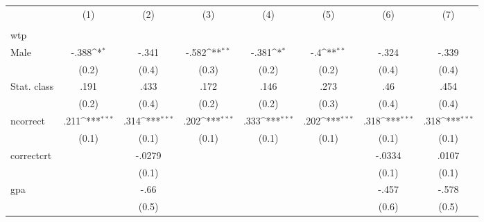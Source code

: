 {
\def\sym#1{\ifmmode^{#1}\else\(^{#1}\)\fi}
\begin{tabular}{l*{7}{c}}
\hline\hline
                &\multicolumn{1}{c}{(1)}&\multicolumn{1}{c}{(2)}&\multicolumn{1}{c}{(3)}&\multicolumn{1}{c}{(4)}&\multicolumn{1}{c}{(5)}&\multicolumn{1}{c}{(6)}&\multicolumn{1}{c}{(7)}\\
                &\multicolumn{1}{c}{}&\multicolumn{1}{c}{}&\multicolumn{1}{c}{}&\multicolumn{1}{c}{}&\multicolumn{1}{c}{}&\multicolumn{1}{c}{}&\multicolumn{1}{c}{}\\
\hline
wtp             &                  &                  &                  &                  &                  &                  &                  \\
Male            &    -.388\sym{*}  &    -.341         &    -.582\sym{**} &    -.381\sym{*}  &      -.4\sym{**} &    -.324         &    -.339         \\
                &    (0.2)         &    (0.4)         &    (0.3)         &    (0.2)         &    (0.2)         &    (0.4)         &    (0.4)         \\
Stat. class     &     .191         &     .433         &     .172         &     .146         &     .273         &      .46         &     .454         \\
                &    (0.2)         &    (0.4)         &    (0.2)         &    (0.2)         &    (0.3)         &    (0.4)         &    (0.4)         \\
ncorrect        &     .211\sym{***}&     .314\sym{***}&     .202\sym{***}&     .333\sym{***}&     .202\sym{***}&     .318\sym{***}&     .318\sym{***}\\
                &    (0.1)         &    (0.1)         &    (0.1)         &    (0.1)         &    (0.1)         &    (0.1)         &    (0.1)         \\
correctcrt      &                  &   -.0279         &                  &                  &                  &   -.0334         &    .0107         \\
                &                  &    (0.1)         &                  &                  &                  &    (0.1)         &    (0.1)         \\
gpa             &                  &     -.66         &                  &                  &                  &    -.457         &    -.578         \\
                &                  &    (0.5)         &                  &                  &                  &    (0.6)         &    (0.5)         \\

\end{tabular}}
